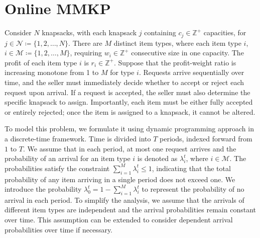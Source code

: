 \section{Online MMKP}\label{sec_dynamic_seat}
Consider $N$ knapsacks, with each knapsack $j$ containing $c_j \in \mathbb{Z}^{+}$ capacities, for $j \in \mathcal{N} \coloneqq \{1,2, \ldots, N\}$. There are $M$ distinct item types, where each item type $i$, $i \in \mathcal{M} \coloneqq \{1, 2, \ldots, M\}$, requiring $w_i \in \mathbb{Z}^{+}$ consecutive size in one capacity. The profit of each item type $i$ is $r_{i} \in \mathbb{Z}^{+}$. Suppose that the profit-weight ratio is increasing monotone from 1 to $M$ for type $i$. Requests arrive sequentially over time, and the seller must immediately decide whether to accept or reject each request upon arrival. If a request is accepted, the seller must also determine the specific knapsack to assign. Importantly, each item must be either fully accepted or entirely rejected; once the item is assigned to a knapsack, it cannot be altered.


To model this problem, we formulate it using dynamic programming approach in a discrete-time framework. Time is divided into $T$ periods, indexed forward from $1$ to $T$. We assume that in each period, at most one request arrives and the probability of an arrival for an item type $i$ is denoted as $\lambda_i^{t}$, where $i \in \mathcal{M}$. The probabilities satisfy the constraint $\sum_{i=1}^M \lambda_i^{t} \leq 1$, indicating that the total probability of any item arriving in a single period does not exceed one. We introduce the probability $\lambda_0^{t} = 1 - \sum_{i=1}^{M} \lambda_i^{t}$ to represent the probability of no arrival in each period. To simplify the analysis, we assume that the arrivals of different item types are independent and the arrival probabilities remain constant over time. This assumption can be extended to consider dependent arrival probabilities over time if necessary.


